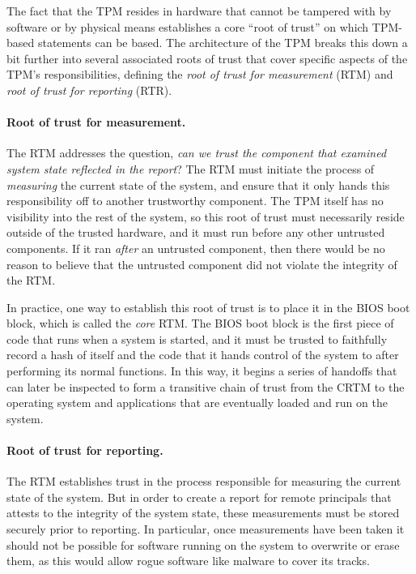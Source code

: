 \documentclass[11pt,twoside]{scrartcl}
\begin{document}
The fact that the TPM resides in hardware that cannot be tampered with by software or by physical means establishes a core ``root of trust'' on which TPM-based statements can be based. The architecture of the TPM breaks this down a bit further into several associated roots of trust that cover specific aspects of the TPM's responsibilities, defining the \emph{root of trust for measurement} (RTM) and \emph{root of trust for reporting} (RTR).

\paragraph{Root of trust for measurement.} The RTM addresses the question, \emph{can we trust the component that examined system state reflected in the report}? The RTM must initiate the process of \emph{measuring} the current state of the system, and ensure that it only hands this responsibility off to another trustworthy component. The TPM itself has no visibility into the rest of the system, so this root of trust must necessarily reside outside of the trusted hardware, and it must run before any other untrusted components. If it ran \emph{after} an untrusted component, then there would be no reason to believe that the untrusted component did not violate the integrity of the RTM. 

In practice, one way to establish this root of trust is to place it in the BIOS boot block, which is called the \emph{core} RTM. The BIOS boot block is the first piece of code that runs when a system is started, and it must be trusted to faithfully record a hash of itself and the code that it hands control of the system to after performing its normal functions. In this way, it begins a series of handoffs that can later be inspected to form a transitive chain of trust from the CRTM to the operating system and applications that are eventually loaded and run on the system.

\paragraph{Root of trust for reporting.} The RTM establishes trust in the process responsible for measuring the current state of the system. But in order to create a report for remote principals that attests to the integrity of the system state, these measurements must be stored securely prior to reporting. In particular, once measurements have been taken it should not be possible for software running on the system to overwrite or erase them, as this would allow rogue software like malware to cover its tracks. 
\end{document}
